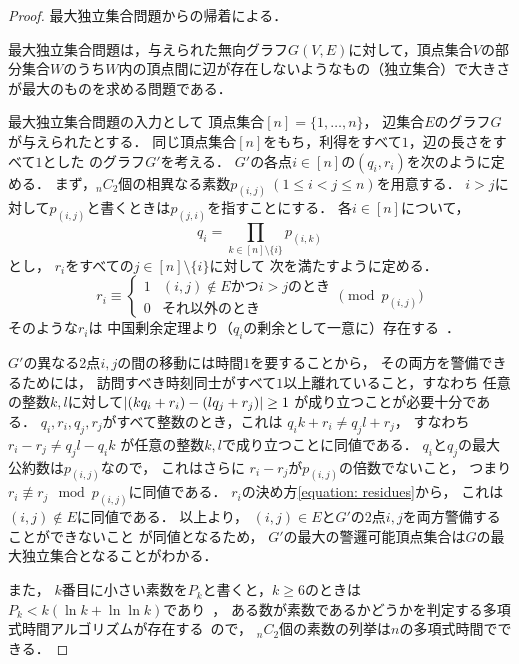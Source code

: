 \begin{proof}
最大独立集合問題からの帰着による．

最大独立集合問題は，与えられた無向グラフ$G(V, E)$に対して，頂点集合$V$の部分集合$W$のうち$W$内の頂点間に辺が存在しないようなもの（独立集合）で大きさが最大のものを求める問題である．

\newcommand{\primenum}[2]{p_{(#1,#2)}}
最大独立集合問題の入力として
頂点集合$[n] = \{1, \ldots, n\}$，
辺集合$E$のグラフ$G$が与えられたとする．
同じ頂点集合$[n]$をもち，利得をすべて$1$，辺の長さをすべて$1$とした
{\graphUnit}のグラフ$G'$を考える．
$G'$の各点$i \in [n]$の{\exactIdletime}$(q_i, r_i)$を次のように定める．
まず，${}_n C_2$個の相異なる素数$\primenum{i}{j}\ (1 \leq i < j \leq n)$を用意する．
$i > j$に対して$\primenum{i}{j}$と書くときは$\primenum{j}{i}$を指すことにする．
各$i \in [n]$について，
\begin{equation}
  q_i = \prod_{k \in [n] \setminus \{i\}} \primenum{i}{k}
\end{equation}
とし，
$r _i$をすべての$j \in [n] \setminus \{i\}$に対して
次を満たすように定める．
\begin{equation}
\label{equation: residues}
  r _i
 \equiv
  \begin{cases}
    1 & \text{$(i, j) \notin E$かつ$i > j$のとき} \\
    0 & \text{それ以外のとき}
  \end{cases}
 \pmod{p _{(i, j)}}
\end{equation}
そのような$r _i$は
中国剰余定理より（$q _i$の剰余として一意に）存在する~\cite{}．

$G'$の異なる2点$i, j$の間の移動には時間$1$を要することから，
その両方を警備できるためには，
訪問すべき時刻同士がすべて$1$以上離れていること，すなわち
任意の整数$k, l$に対して$\lvert{(k q_i + r_i) - (l q_j + r_j)}\rvert \geq 1$%
が成り立つことが必要十分である．
$q_i, r_i, q_j, r_j$がすべて整数のとき，これは
$q_i k + r_i \neq q_j l + r_j$，
すなわち
$r_i - r_j \neq q_j l - q_i k$%
が任意の整数$k, l$で成り立つことに同値である．
$q _i$と$q _j$の最大公約数は$p _{(i, j)}$なので，
これはさらに
$r_i - r_j$が$p _{(i, j)}$の倍数でないこと，
つまり$r_i \not\equiv r_j \mod p _{(i, j)}$に同値である．
$r_i$の決め方\eqref{equation: residues}から，
これは$(i, j) \notin E$に同値である．
以上より，
$(i, j) \in E$と$G'$の2点$i, j$を両方警備することができないこと
が同値となるため，
$G'$の最大の警邏可能頂点集合は$G$の最大独立集合となることがわかる．

また，
$k$番目に小さい素数を$P_k$と書くと，$k \geq 6$のときは
$P_k < k( \ln k + \ln\ln k )$であり~\cite{dusart1999k}，
ある数が素数であるかどうかを判定する多項式時間アルゴリズムが存在する~\cite{agrawal2004primes}ので，
${}_n C_2$個の素数の列挙は$n$の多項式時間でできる．
\end{proof}





